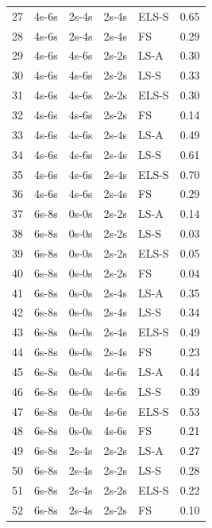 \begin{table}[ht]
\begin{tabular}{rllllr}
  27 & 4s-6s & 2s-4s & 2s-4s & ELS-S & 0.65 \\ 
  28 & 4s-6s & 2s-4s & 2s-4s & FS & 0.29 \\
  \hline
  29 & 4s-6s & 4s-6s & 2s-2s & LS-A & 0.30 \\ 
  30 & 4s-6s & 4s-6s & 2s-2s & LS-S & 0.33 \\ 
  31 & 4s-6s & 4s-6s & 2s-2s & ELS-S & 0.30 \\ 
  32 & 4s-6s & 4s-6s & 2s-2s & FS & 0.14 \\
  \hline
  33 & 4s-6s & 4s-6s & 2s-4s & LS-A & 0.49 \\ 
  34 & 4s-6s & 4s-6s & 2s-4s & LS-S & 0.61 \\ 
  35 & 4s-6s & 4s-6s & 2s-4s & ELS-S & 0.70 \\ 
  36 & 4s-6s & 4s-6s & 2s-4s & FS & 0.29 \\
  \hline
  37 & 6s-8s & 0s-0s & 2s-2s & LS-A & 0.14 \\ 
  38 & 6s-8s & 0s-0s & 2s-2s & LS-S & 0.03 \\
  39 & 6s-8s & 0s-0s & 2s-2s & ELS-S & 0.05 \\ 
  40 & 6s-8s & 0s-0s & 2s-2s & FS & 0.04 \\ 
  \hline
  41 & 6s-8s & 0s-0s & 2s-4s & LS-A & 0.35 \\ 
  42 & 6s-8s & 0s-0s & 2s-4s & LS-S & 0.34 \\ 
  43 & 6s-8s & 0s-0s & 2s-4s & ELS-S & 0.49 \\ 
  44 & 6s-8s & 0s-0s & 2s-4s & FS & 0.23 \\ 
  \hline
  45 & 6s-8s & 0s-0s & 4s-6s & LS-A & 0.44 \\ 
  46 & 6s-8s & 0s-0s & 4s-6s & LS-S & 0.39 \\ 
  47 & 6s-8s & 0s-0s & 4s-6s & ELS-S & 0.53 \\ 
  48 & 6s-8s & 0s-0s & 4s-6s & FS & 0.21 \\ 
  \hline
  49 & 6s-8s & 2s-4s & 2s-2s & LS-A & 0.27 \\ 
  50 & 6s-8s & 2s-4s & 2s-2s & LS-S & 0.28 \\ 
  51 & 6s-8s & 2s-4s & 2s-2s & ELS-S & 0.22 \\ 
  52 & 6s-8s & 2s-4s & 2s-2s & FS & 0.10 \\
  \hline
\end{tabular}
\end{table}

